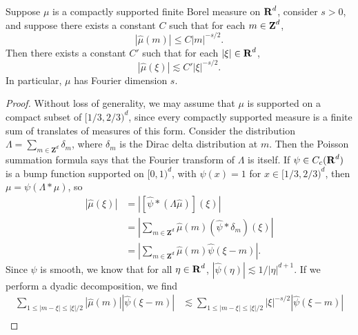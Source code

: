\begin{lemma} \label{discretefouriermeasures}
    Suppose $\mu$ is a compactly supported finite Borel measure on $\operatorname{\mathbf{R}}^d$, consider $s > 0$, and suppose there exists a constant $C$ such that for each $m \in \operatorname{\mathbf{Z}}^d$,
    \begin{equation} \label{mufourierbound1}   
        |\widehat{\mu}(m)| \leq C |m|^{-s/2}.
    \end{equation} 
    Then there exists a constant $C'$ such that for each $|\xi| \in \operatorname{\mathbf{R}}^d$,
    \begin{equation} \label{mufourierbound2}
        |\widehat{\mu}(\xi)| \lesssim C' |\xi|^{-s/2}.
    \end{equation}
    In particular, $\mu$ has Fourier dimension $s$.
\end{lemma}
\begin{proof}
    Without loss of generality, we may assume that $\mu$ is supported on a compact subset of $[1/3,2/3)^d$, since every compactly supported measure is a finite sum of translates of measures of this form. Consider the distribution $\Lambda = \sum_{m \in \mathbf{Z}^d} \delta_m$, where $\delta_m$ is the Dirac delta distribution at $m$. Then the Poisson summation formula says that the Fourier transform of $\Lambda$ is itself. If $\psi \in C_c(\operatorname{\mathbf{R}}^d)$ is a bump function supported on $[0,1)^d$, with $\psi(x) = 1$ for $x \in [1/3,2/3)^d$, then $\mu = \psi (\Lambda * \mu)$, so
    \begin{equation} \label{mubounded}
    \begin{split}
        |\widehat{\mu}(\xi)| &= \left| \left[ \widehat{\psi} * (\Lambda \widehat{\mu}) \right](\xi) \right|\\
        &= \left| \sum_{m \in \mathbf{Z}^d} \widehat{\mu}(m)(\widehat{\psi} * \delta_m)(\xi) \right|\\
        &= \left| \sum_{m \in \mathbf{Z}^d} \widehat{\mu}(m) \widehat{\psi}(\xi - m) \right|.
    \end{split}
    \end{equation}
    Since $\psi$ is smooth, we know that for all $\eta \in \operatorname{\mathbf{R}}^d$, $|\widehat{\psi}(\eta)| \lesssim 1/|\eta|^{d+1}$. If we perform a dyadic decomposition, we find
    \begin{equation}
        \label{calculation1}
    \begin{split}
        \sum_{1 \leq |m - \xi| \leq |\xi|/2} |\widehat{\mu}(m)| |\widehat{\psi}(\xi - m)| &\lesssim \sum_{1 \leq |m - \xi| \leq |\xi|/2} |\xi|^{-s/2} |\widehat{\psi}(\xi - m)|\\

\end{split}
\end{equation}
\end{proof}
